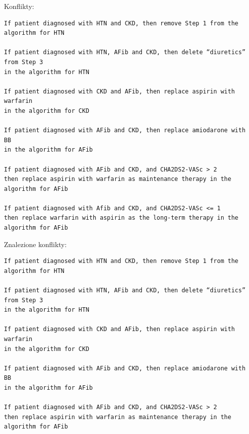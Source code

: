 Konflikty:
\begin{verbatim}
If patient diagnosed with HTN and CKD, then remove Step 1 from the algorithm for HTN

If patient diagnosed with HTN, AFib and CKD, then delete “diuretics” from Step 3 
in the algorithm for HTN

If patient diagnosed with CKD and AFib, then replace aspirin with warfarin 
in the algorithm for CKD

If patient diagnosed with AFib and CKD, then replace amiodarone with BB 
in the algorithm for AFib

If patient diagnosed with AFib and CKD, and CHA2DS2-VASc > 2
then replace aspirin with warfarin as maintenance therapy in the algorithm for AFib

If patient diagnosed with Afib and CKD, and CHA2DS2-VASc <= 1
then replace warfarin with aspirin as the long-term therapy in the algorithm for AFib
\end{verbatim}
Znalezione konflikty:
\begin{verbatim}
If patient diagnosed with HTN and CKD, then remove Step 1 from the algorithm for HTN

If patient diagnosed with HTN, AFib and CKD, then delete “diuretics” from Step 3
in the algorithm for HTN

If patient diagnosed with CKD and AFib, then replace aspirin with warfarin 
in the algorithm for CKD

If patient diagnosed with AFib and CKD, then replace amiodarone with BB 
in the algorithm for AFib

If patient diagnosed with AFib and CKD, and CHA2DS2-VASc > 2
then replace aspirin with warfarin as maintenance therapy in the algorithm for AFib
\end{verbatim}
\newpage
